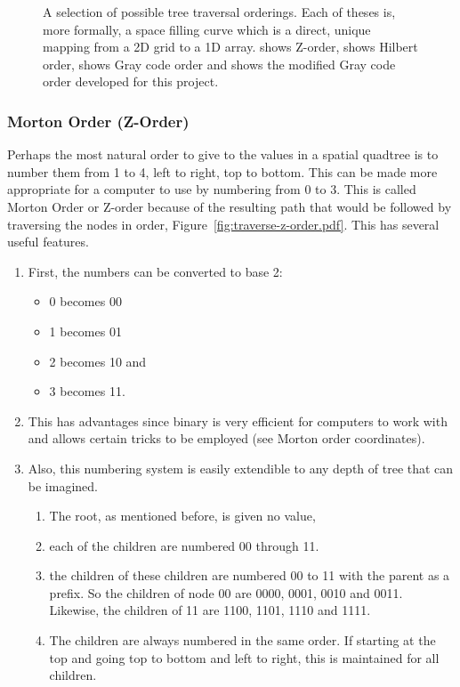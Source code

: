 \begin{figure}[tbhp]
	\caption[A selection of possible tree traversal orderings]{A selection of
		possible tree traversal orderings. Each of theses is, more formally, a
		space filling curve which is a direct, unique mapping from a 2D grid to
		a 1D array.  shows Z-order,
		 shows Hilbert order,
		 shows Gray code order and
		 shows the modified Gray code
		order developed for this project.}\label{fig:order_traversals}
\end{figure}

\subsubsection[Morton Order]{Morton Order (Z-Order)}
\label{ssub:morton_code_z_order_}

Perhaps the most natural order to give to the values in a spatial quadtree is
to number them from 1 to 4, left to right, top to bottom. This can be made
more appropriate for a computer to use by numbering from 0 to 3. This is
called Morton Order\cite{mortoncomputer} or Z-order because of the resulting
path that would be followed by traversing the nodes in order,
Figure~\ref{fig:traverse-z-order.pdf}. This has several useful features.

\begin{enumerate}
	\item First, the numbers can be converted to base 2:
	\begin{itemize}
		\item 0 becomes 00
		\item 1 becomes 01
		\item 2 becomes 10 and
		\item 3 becomes 11.
	\end{itemize}

	\item This has advantages since binary is very efficient for computers to
	work with and allows certain tricks to be employed (see Morton order
	coordinates).

	\item Also, this numbering system is easily extendible to any depth of
	tree that can be imagined.

	\begin{enumerate}
		\item The root, as mentioned before, is given no value,
		\item each of the children are numbered {00} through 11.

		\item the children of these children are numbered 00 to 11 with the
		parent as a prefix. So the children of node 00 are 0000, 0001, 0010
		and 0011. Likewise, the children of 11 are 1100, 1101, 1110 and 1111.

		\item The children are always numbered in the same order. If starting
		at the top and going top to bottom and left to right, this is
		maintained for all children.
	\end{enumerate}
\end{enumerate}

